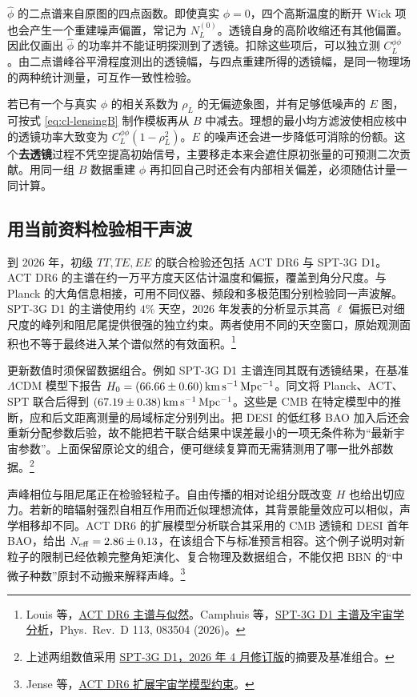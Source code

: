 $\widehat\phi$ 的二点谱来自原图的四点函数。即使真实 $\phi=0$，四个高斯温度的断开 Wick 项也会产生一个重建噪声偏置，常记为 $N_L^{(0)}$。透镜自身的高阶收缩还有其他偏置。因此仅画出 $\widehat\phi$ 的功率并不能证明探测到了透镜。扣除这些项后，可以独立测 $C_L^{\phi\phi}$。由二点谱峰谷平滑程度测出的透镜幅，与四点重建所得的透镜幅，是同一物理场的两种统计测量，可互作一致性检验。

若已有一个与真实 $\phi$ 的相关系数为 $\rho_L$ 的无偏迹象图，并有足够低噪声的 $E$ 图，可按式 \eqref{eq:cl-lensingB} 制作模板再从 $B$ 中减去。理想的最小均方滤波使相应核中的透镜功率大致变为 $C_L^{\phi\phi}(1-\rho_L^2)$。$E$ 的噪声还会进一步降低可消除的份额。这个\textbf{去透镜}过程不凭空提高初始信号，主要移走本来会遮住原初张量的可预测二次贡献。用同一组 $B$ 数据重建 $\phi$ 再扣回自己时还会有内部相关偏差，必须随估计量一同计算。

\subsection{用当前资料检验相干声波}

到 2026 年，初级 $TT,TE,EE$ 的联合检验还包括 ACT DR6 与 SPT-3G D1。ACT DR6 的主谱在约一万平方度天区估计温度和偏振，覆盖到角分尺度。与 Planck 的大角信息相接，可用不同仪器、频段和多极范围分别检验同一声波解。SPT-3G D1 的主谱使用约 $4\%$ 天空，2026 年发表的分析显示其高 $\ell$ 偏振已对细尺度的峰列和阻尼尾提供很强的独立约束。两者使用不同的天空窗口，原始观测面积也不等于最终进入某个谱似然的有效面积。\footnote{Louis 等，\href{https://doi.org/10.1088/1475-7516/2025/11/062}{ACT DR6 主谱与似然}。Camphuis 等，\href{https://doi.org/10.1103/7wt3-9v2y}{SPT-3G D1 主谱及宇宙学分析}，Phys.\ Rev.\ D 113, 083504 (2026)。}

更新数值时须保留数据组合。例如 SPT-3G D1 主谱连同其既有透镜结果，在基准 $\Lambda$CDM 模型下报告 $H_0=(66.66\pm0.60)\,{\rm km\,s^{-1}\,Mpc^{-1}}$。同文将 Planck、ACT、SPT 联合后得到 $(67.19\pm0.38)\,{\rm km\,s^{-1}\,Mpc^{-1}}$。这些是 CMB 在特定模型中的推断，应和后文距离测量的局域标定分别列出。把 DESI 的低红移 BAO 加入后还会重新分配参数后验，故不能把若干联合结果中误差最小的一项无条件称为“最新宇宙参数”。上面保留原论文的组合，便可继续复算而无需猜测用了哪一批外部数据。\footnote{上述两组数值采用 \href{https://arxiv.org/abs/2506.20707v2}{SPT-3G D1，2026 年 4 月修订版}的摘要及基准组合。}

声峰相位与阻尼尾正在检验轻粒子。自由传播的相对论组分既改变 $H$ 也给出切应力。若新的暗辐射强烈自相互作用而近似理想流体，其背景能量效应可以相似，声学相移却不同。ACT DR6 的扩展模型分析联合其采用的 CMB 透镜和 DESI 首年 BAO，给出 $N_{\rm eff}=2.86\pm0.13$，在该组合下与标准预言相容。这个例子说明对新粒子的限制已经依赖完整角矩演化、复合物理及数据组合，不能仅把 BBN 的“中微子种数”原封不动搬来解释声峰。\footnote{Jense 等，\href{https://arxiv.org/abs/2503.14454}{ACT DR6 扩展宇宙学模型约束}。}

